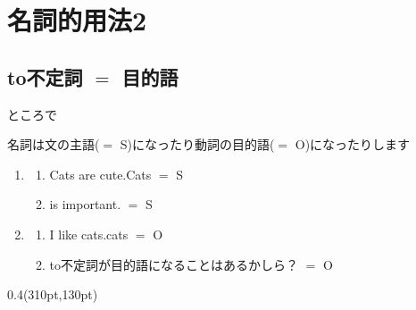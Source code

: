 \documentclass[aspectratio=169,xcolor={dvipsnames,table}]{beamer}
\begin{document}
\section{名詞的用法2}
\subsection{to不定詞 $=$ 目的語}
\begin{frame}[plain,t]{ところで}
 
名詞は文の主語($=$ S)になったり動詞の目的語($=$ O)になったりします


\begin{enumerate}
 \item<2-> \begin{enumerate}
	\item<2-> Cats are cute.\hfill{}Cats $=$ S
	\item<4->  is important.\hfill{} $=$ S
       \end{enumerate}
 \item<3-> \begin{enumerate}
	\item<3-> I like cats.\hfill{}cats $=$ O
	\item<5-> to不定詞が目的語になることはあるかしら？\hfill{} $=$ O
       \end{enumerate}
\end{enumerate}

\begin{textblock*}{0.4\linewidth}(310pt,130pt)
\end{textblock*}
\end{frame}
\end{document}
